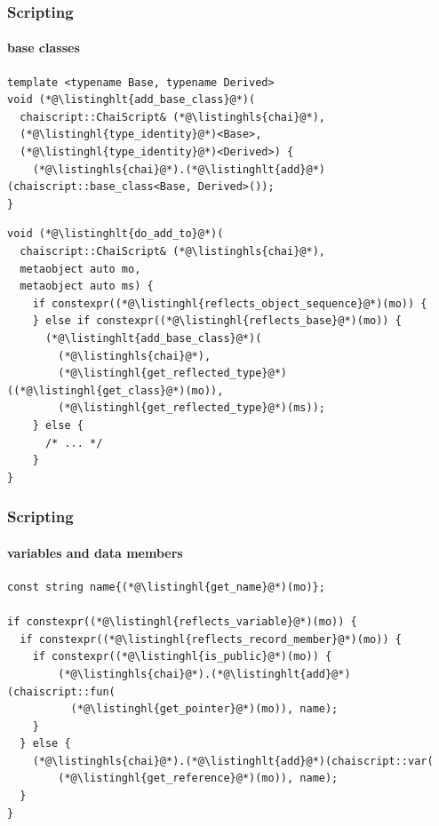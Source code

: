 \documentclass[compress,table,xcolor=table]{beamer}
\begin{document}
\begin{frame}[fragile]
  \frametitle{Scripting}
  \framesubtitle{base classes}
  \begin{lstlisting}[language=c++2x,basicstyle=\scriptsize\ttfamily]
template <typename Base, typename Derived>
void (*@\listinghlt{add_base_class}@*)(
  chaiscript::ChaiScript& (*@\listinghls{chai}@*),
  (*@\listinghl{type_identity}@*)<Base>,
  (*@\listinghl{type_identity}@*)<Derived>) {
    (*@\listinghls{chai}@*).(*@\listinghlt{add}@*)(chaiscript::base_class<Base, Derived>());
}
  \end{lstlisting}
  \begin{lstlisting}[language=c++2x,basicstyle=\scriptsize\ttfamily]
void (*@\listinghlt{do_add_to}@*)(
  chaiscript::ChaiScript& (*@\listinghls{chai}@*),
  metaobject auto mo,
  metaobject auto ms) {
    if constexpr((*@\listinghl{reflects_object_sequence}@*)(mo)) {
    } else if constexpr((*@\listinghl{reflects_base}@*)(mo)) {
      (*@\listinghlt{add_base_class}@*)(
        (*@\listinghls{chai}@*),
        (*@\listinghl{get_reflected_type}@*)((*@\listinghl{get_class}@*)(mo)),
        (*@\listinghl{get_reflected_type}@*)(ms));
    } else {
      /* ... */
    }
}
  \end{lstlisting}
\end{frame}
\begin{frame}[fragile]
  \frametitle{Scripting}
  \framesubtitle{variables and data members}
  \begin{lstlisting}[language=c++2x,basicstyle=\small\ttfamily]
const string name{(*@\listinghl{get_name}@*)(mo)};

if constexpr((*@\listinghl{reflects_variable}@*)(mo)) {
  if constexpr((*@\listinghl{reflects_record_member}@*)(mo)) {
    if constexpr((*@\listinghl{is_public}@*)(mo)) {
        (*@\listinghls{chai}@*).(*@\listinghlt{add}@*)(chaiscript::fun(
          (*@\listinghl{get_pointer}@*)(mo)), name);
    }
  } else {
    (*@\listinghls{chai}@*).(*@\listinghlt{add}@*)(chaiscript::var(
        (*@\listinghl{get_reference}@*)(mo)), name);
  }
}
  \end{lstlisting}
\end{frame}
\end{document}
